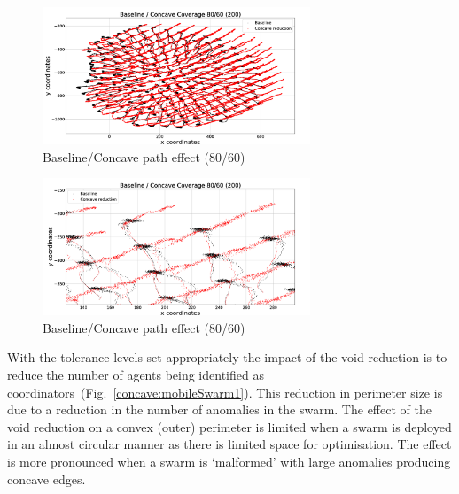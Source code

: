 \documentclass[preprint,12pt]{elsarticle}
\begin{document}
\begin{figure}
\begin{center}
\includegraphics[width=8cm]{figures/BaselineConcaveEffectPath80601}
\end{center}
\caption{Baseline/Concave path effect (80/60)\label{concave:BaselineConcaveEffectPath80601}}
\end{figure}

\begin{figure}
\begin{center}
\includegraphics[width=8cm]{figures/BaselineConcaveEffectPath80602}
\end{center}
\caption{Baseline/Concave path effect (80/60)\label{concave:BaselineConcaveEffectPath80602}}
\end{figure}
With the tolerance levels set appropriately the impact of the void reduction is to reduce the number of agents being identified as coordinators~(Fig.~\ref{concave:mobileSwarm1}). This reduction in perimeter size is due to a reduction in the number of anomalies in the swarm. The effect of the void reduction on a convex (outer) perimeter is limited when a swarm is deployed in an almost circular manner as there is limited space for optimisation. The effect is more pronounced when a swarm is `malformed' with large anomalies producing concave edges.
\end{document}
